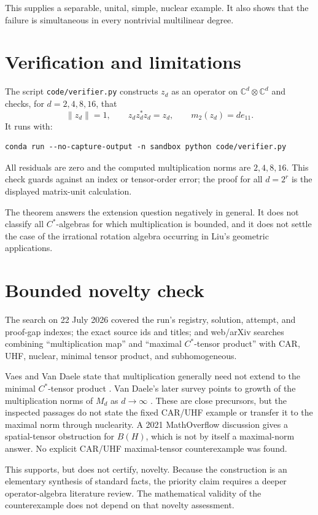 \documentclass[11pt]{article}
\newcommand{\M}{M}
\newcommand{\C}{\mathbb C}
\begin{document}
This supplies a separable, unital, simple, nuclear example.  It also shows
that the failure is simultaneous in every nontrivial multilinear degree.

\section{Verification and limitations}

The script \texttt{code/verifier.py} constructs $z_d$ as an operator on
$\C^d\otimes\C^d$ and checks, for $d=2,4,8,16$, that
\[
 \|z_d\|=1,\qquad z_dz_d^*z_d=z_d,
 \qquad m_2(z_d)=d e_{11}.
\]
It runs with:
\begin{verbatim}
conda run --no-capture-output -n sandbox python code/verifier.py
\end{verbatim}
All residuals are zero and the computed multiplication norms are
$2,4,8,16$.  This check guards against an index or tensor-order error; the
proof for all $d=2^r$ is the displayed matrix-unit calculation.

The theorem answers the extension question negatively in general.  It does
not classify all $C^*$-algebras for which multiplication is bounded, and it
does not settle the case of the irrational rotation algebra occurring in
Liu's geometric applications.

\section{Bounded novelty check}\label{sec:novelty}

The search on 22 July 2026 covered the run's registry, solution, attempt, and
proof-gap indexes; the exact source ids and titles; and web/arXiv searches
combining ``multiplication map'' and ``maximal $C^*$-tensor product'' with
CAR, UHF, nuclear, minimal tensor product, and subhomogeneous.

Vaes and Van Daele state that multiplication generally need not extend to the
minimal $C^*$-tensor product \cite[Introduction]{VaesVanDaele}.  Van Daele's
later survey points to growth of the multiplication norms of $\M_d$ as
$d\to\infty$ \cite[Remark~3.3]{VanDaele}.  These are close precursors, but the
inspected passages do not state the fixed CAR/UHF example or transfer it to
the maximal norm through nuclearity.  A 2021 MathOverflow discussion gives a
spatial-tensor obstruction for $B(H)$, which is not by itself a maximal-norm
answer.  No explicit CAR/UHF maximal-tensor counterexample was found.

This supports, but does not certify, novelty.  Because the construction is an
elementary synthesis of standard facts, the priority claim requires a deeper
operator-algebra literature review.  The mathematical validity of the
counterexample does not depend on that novelty assessment.
\end{document}
